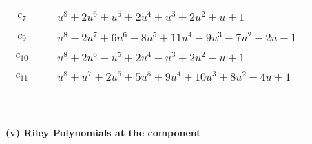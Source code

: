 \documentclass[1p]{elsarticle_modified}
\theoremstyle{definition}
\begin{document}
\begin{tabular}{m{50pt}|m{274pt}}
\hline $$\begin{aligned}c_{7}\end{aligned}$$&$\begin{aligned}
&u^8+2 u^6+u^5+2 u^4+u^3+2 u^2+u+1
\end{aligned}$\\
\hline $$\begin{aligned}c_{9}\end{aligned}$$&$\begin{aligned}
&u^8-2 u^7+6 u^6-8 u^5+11 u^4-9 u^3+7 u^2-2 u+1
\end{aligned}$\\
\hline $$\begin{aligned}c_{10}\end{aligned}$$&$\begin{aligned}
&u^8+2 u^6- u^5+2 u^4- u^3+2 u^2- u+1
\end{aligned}$\\
\hline $$\begin{aligned}c_{11}\end{aligned}$$&$\begin{aligned}
&u^8+u^7+2 u^6+5 u^5+9 u^4+10 u^3+8 u^2+4 u+1
\end{aligned}$\\
\hline
\end{tabular}\\~\\
\newpage\renewcommand{\arraystretch}{1}
\flushleft \textbf{(v) Riley Polynomials at the component}\newline \\
\end{document}
